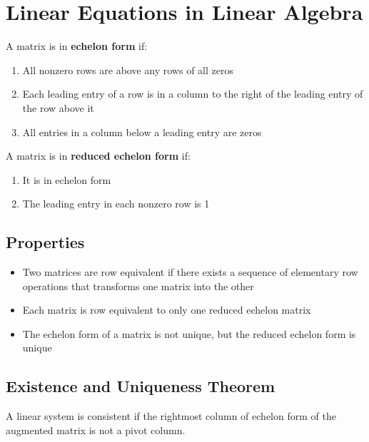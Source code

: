 \documentclass{article}
\begin{document}
\setlength{\parindent}{0pt}

\section*{Linear Equations in Linear Algebra}

A matrix is in \textbf{echelon form} if:
\begin{enumerate}
    \item All nonzero rows are above any rows of all zeros
    \item Each leading entry of a row is in a column to the right of the leading entry of the row
    above it
    \item All entries in a column below a leading entry are zeros
\end{enumerate}

\noindent
A matrix is in \textbf{reduced echelon form} if:
\begin{enumerate}
    \item It is in echelon form
    \item The leading entry in each nonzero row is 1
\end{enumerate}

\subsection*{Properties}
\begin{itemize}
    \item Two matrices are row equivalent if there exists a sequence of elementary row operations that transforms one matrix into the other
    \item Each matrix is row equivalent to only one reduced echelon matrix
    \item The echelon form of a matrix is not unique, but the reduced echelon form is unique
\end{itemize}

\subsection*{Existence and Uniqueness Theorem}
A linear system is consistent if the rightmost column of echelon form of the augmented matrix is not a pivot column.
\end{document}
